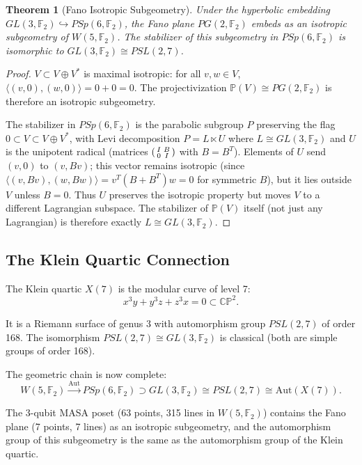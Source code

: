 \documentclass[11pt,a4paper]{article}
\newtheorem{theorem}{Theorem}[section]
\theoremstyle{remark}
\newcommand{\CP}{\mathbb{CP}}
\newcommand{\F}{\mathbb{F}}
\begin{document}
\begin{theorem}[Fano Isotropic Subgeometry]
\label{thm:fano-isotropic}
Under the hyperbolic embedding $GL(3, \F_2) \hookrightarrow PSp(6, \F_2)$,
the Fano plane $PG(2, \F_2)$ embeds as an isotropic subgeometry of
$W(5, \F_2)$. The stabilizer of this subgeometry in $PSp(6, \F_2)$ is
isomorphic to $GL(3, \F_2) \cong PSL(2, 7)$.
\end{theorem}

\begin{proof}
$V \subset V \oplus V^*$ is maximal isotropic: for all $v, w \in V$,
$\langle (v, 0), (w, 0) \rangle = 0 + 0 = 0$. The projectivization
$\mathbb{P}(V) \cong PG(2, \F_2)$ is therefore an isotropic subgeometry.

The stabilizer in $PSp(6, \F_2)$ is the parabolic subgroup $P$ preserving
the flag $0 \subset V \subset V \oplus V^*$, with Levi decomposition
$P = L \ltimes U$ where $L \cong GL(3, \F_2)$ and $U$ is the unipotent
radical (matrices $\begin{psmallmatrix} I & B \\ 0 & I \end{psmallmatrix}$
with $B = B^T$). Elements of $U$ send $(v, 0)$ to $(v, Bv)$; this vector
remains isotropic (since $\langle (v,Bv), (w,Bw) \rangle = v^T(B+B^T)w = 0$
for symmetric $B$), but it lies outside $V$ unless $B = 0$. Thus $U$
preserves the isotropic property but moves $V$ to a different Lagrangian
subspace. The stabilizer of $\mathbb{P}(V)$ itself (not just any
Lagrangian) is therefore exactly $L \cong GL(3, \F_2)$. \qedhere
\end{proof}

\subsection{The Klein Quartic Connection}
\label{sec:klein-connection}

The Klein quartic $X(7)$ is the modular curve of level 7:
\[
x^3 y + y^3 z + z^3 x = 0 \subset \CP^2.
\]

It is a Riemann surface of genus 3 with automorphism group $PSL(2, 7)$
of order 168. The isomorphism $PSL(2, 7) \cong GL(3, \F_2)$ is classical
(both are simple groups of order 168).

The geometric chain is now complete:
\[
W(5, \F_2) \xrightarrow{\text{Aut}} PSp(6, \F_2)
\supset GL(3, \F_2) \cong PSL(2, 7) \cong \text{Aut}(X(7)).
\]

The 3-qubit MASA poset (63 points, 315 lines in $W(5, \F_2)$) contains
the Fano plane (7 points, 7 lines) as an isotropic subgeometry, and the
automorphism group of this subgeometry is the same as the automorphism
group of the Klein quartic.
\end{document}

